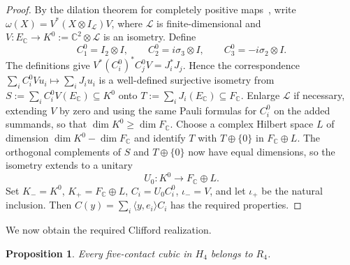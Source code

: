 \documentclass[11pt,onecolumn]{article}
\theoremstyle{blueplain}
\newtheorem{proposition}[proposition]{Proposition}
\theoremstyle{bluedefinition}
\theoremstyle{bluedefinition}
\begin{document}
\begin{proof}
By the dilation theorem for completely positive maps~\cite{Stinespring}, write
$\omega(X)=V^*(X\otimes I_{\mathcal L})V$, where $\mathcal L$ is
finite-dimensional and
$V\colon E_{\mathbb C}\to K^0:=\mathbb C^2\otimes\mathcal L$
is an isometry.  Define
\[
 C_1^0=I_2\otimes I,\qquad
 C_2^0=i\sigma_3\otimes I,\qquad
 C_3^0=-i\sigma_2\otimes I.
\]
The definitions give $V^*(C_i^0)^*C_j^0V=J_i^*J_j$.
Hence the correspondence $\sum_iC_i^0Vu_i\mapsto\sum_iJ_iu_i$ is a
well-defined surjective isometry from
$S:=\sum_iC_i^0V(E_{\mathbb C})\subseteq K^0$ onto
$T:=\sum_iJ_i(E_{\mathbb C})\subseteq F_{\mathbb C}$.
Enlarge $\mathcal L$ if necessary, extending $V$ by zero and using the
same Pauli formulas for $C_i^0$ on the added summands, so that
$\dim K^0\geqslant\dim F_{\mathbb C}$.  Choose a complex Hilbert space
$L$ of dimension $\dim K^0-\dim F_{\mathbb C}$ and identify $T$ with
$T\oplus\{0\}$ in $F_{\mathbb C}\oplus L$.
The orthogonal complements of $S$ and $T\oplus\{0\}$ now have equal
dimensions, so the isometry extends to a unitary
\[
 U_0\colon K^0\to F_{\mathbb C}\oplus L.
\]
Set $K_-=K^0$, $K_+=F_{\mathbb C}\oplus L$, $C_i=U_0C_i^0$,
$\iota_-=V$, and let $\iota_+$ be the natural inclusion.  Then
$C(y)=\sum_i\langle y,e_i\rangle C_i$ has the required properties.
\end{proof}

We now obtain the required Clifford realization.

\begin{proposition}
\label{prop:five-clifford}
Every five-contact cubic in $H_4$ belongs to $R_4$.
\end{proposition}
\end{document}
